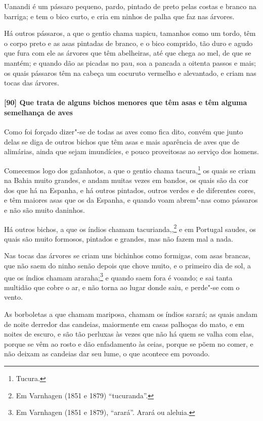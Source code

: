 Uanandi é um pássaro pequeno, pardo, pintado de preto pelas costas e branco na barriga; e
tem o bico curto, e cria em ninhos de palha que faz nas árvores.

Há outros pássaros, a que o gentio chama uapicu, tamanhos como um tordo, têm o corpo preto
e as asas pintadas de branco, e o bico comprido, tão duro e agudo que fura com ele as
árvores que têm abelheiras, até que chega ao mel, de que se mantém; e quando dão as
picadas no pau, soa a pancada a oitenta passos e mais; os quais pássaros têm na cabeça um
cocuruto vermelho e alevantado, e criam nas tocas das árvores.

\paragraph{[90] Que trata de alguns bichos menores que têm asas e têm alguma semelhança de
aves}\quad
Como foi forçado dizer"-se de todas as aves como fica dito, convém que junto delas se diga
de outros bichos que têm asas e mais aparência de aves que de alimárias, ainda que sejam
imundícies, e pouco proveitosas ao serviço dos homens.

Comecemos logo dos gafanhotos, a que o gentio chama tacura,\footnote{ Tucura.} os quais se
criam na Bahia muito grandes, e andam muitas vezes em bandos, os quais são da cor dos que
há na Espanha, e há outros pintados, outros verdes e de diferentes cores, e têm maiores
asas que os da Espanha, e quando voam abrem"-nas como pássaros e não são muito daninhos.

Há outros bichos, a que os índios chamam tacurianda,,\footnote{ Em Varnhagen (1851 e 1879)
``tucuranda''.} e em Portugal saudes, os quais são muito formosos, pintados e grandes,
mas não fazem mal a nada.

Nas tocas das árvores se criam uns bichinhos como formigas, com asas brancas, que não saem
do ninho senão depois que chove muito, e o primeiro dia de sol, a que os índios chamam
araraha;\footnote{ Em Varnhagen (1851 e 1879), ``arará''. Arará ou aleluia.} e quando saem
fora é voando; e sai tanta multidão que cobre o ar, e não torna ao lugar donde saiu, e
perde"-se com o vento.

As borboletas a que chamam mariposa, chamam os índios sarará; as quais andam de noite
derredor das candeias, maiormente em casas palhoças do mato, e em noites de escuro, e são
tão perluxas às vezes que não há quem se valha com elas, porque se vêm ao rosto e dão
enfadamento às ceias, porque se põem no comer, e não deixam as candeias dar seu lume, o
que acontece em povoado.

